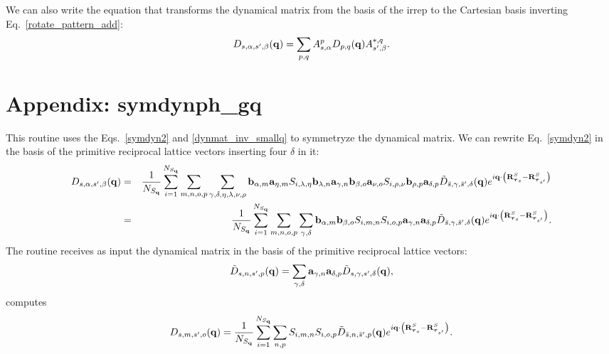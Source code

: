 \documentclass[12pt,a4paper,twoside]{report}
\begin{document}
We can also write the equation that transforms the dynamical matrix from the basis of the irrep to the Cartesian basis inverting Eq.~\ref{rotate_pattern_add}:
\begin{equation}
D_{s,\alpha,s',\beta}({\bf q}) =\sum_{p,q}  A^{p}_{s,\alpha} D_{p,q}({\bf q}) A^{*,q}_{s',\beta}.
\label{dyn_pattern_to_cart}
\end{equation}

\section{Appendix: symdynph\_gq}
This routine uses the Eqs.~\ref{symdyn2} and
\ref{dynmat_inv_smallq} to symmetryze the dynamical matrix. We can rewrite Eq.~\ref{symdyn2} in the basis of the primitive reciprocal lattice vectors inserting four
$\delta$ in it:
\begin{eqnarray}
D_{s,\alpha,s',\beta}({\bf q}) &=& {1\over N_{S_{\bf q}}}
\sum_{i=1}^{N_{S_{\bf q}}}
\sum_{m,n,o,p}
\sum_{\gamma,\delta,\eta,\lambda,\nu,\rho}
{\bf b}_{\alpha,m} {\bf a}_{\eta,m}
S_{i,\lambda,\eta} {\bf b}_{\lambda,n} {\bf a}_{\gamma,n}  {\bf b}_{\beta,o} {\bf a}_{\nu,o} S_{i,\rho,\nu} {\bf b}_{\rho,p} {\bf a}_{\delta,p}
\tilde D_{\bar s,\gamma,\bar s',\delta}({\bf q})
e^{i {\bf q} \cdot \left( {\bf R}^{S}_{\boldsymbol{\tau}_s} - {\bf R}^{S}_{\boldsymbol{\tau}_{s'}} \right) }
\nonumber\\
&=& {1\over N_{S_{\bf q}}}
\sum_{i=1}^{N_{S_{\bf q}}}
\sum_{m,n,o,p}
\sum_{\gamma, \delta}
{\bf b}_{\alpha,m} {\bf b}_{\beta,o}
S_{i,m,n} S_{i,o,p} {\bf a}_{\gamma,n} {\bf a}_{\delta,p}
\tilde D_{\bar s,\gamma,\bar s',\delta}({\bf q})
e^{i {\bf q} \cdot \left( {\bf R}^{S}_{\boldsymbol{\tau}_s} - {\bf R}^{S}_{\boldsymbol{\tau}_{s'}} \right)}.
\label{symdyn2_crys}
\end{eqnarray}
The routine receives as input the dynamical matrix in the basis of the primitive reciprocal lattice vectors: 
\begin{equation}
\tilde D_{s,n,s',p}({\bf q})
=\sum_{\gamma, \delta} {\bf a}_{\gamma,n} {\bf a}_{\delta,p}
\tilde D_{s,\gamma,s',\delta}({\bf q}),
\end{equation}
computes 
\begin{equation}
D_{s,m,s',o}({\bf q})
={1\over N_{S_{\bf q}}}
\sum_{i=1}^{N_{S_{\bf q}}}
\sum_{n,p}
S_{i,m,n} S_{i,o,p}
\tilde D_{\bar s,n,\bar s',p}({\bf q})
e^{i {\bf q} \cdot \left( {\bf R}^{S}_{\boldsymbol{\tau}_s} - {\bf R}^{S}_{\boldsymbol{\tau}_{s'}} \right)}. 
\end{equation}
\end{document}
